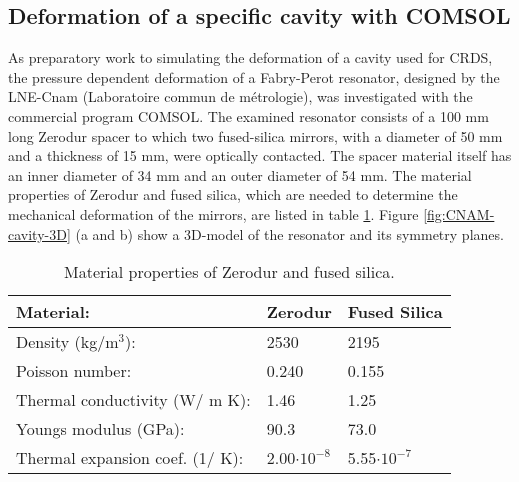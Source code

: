 \subsection{Deformation of a specific cavity with COMSOL}
As preparatory work to simulating the deformation of a cavity used for CRDS, the pressure dependent deformation of a Fabry-Perot resonator, designed by the LNE-Cnam (Laboratoire commun de métrologie), was investigated with the commercial program COMSOL. The examined resonator consists of a 100 mm long Zerodur spacer to which two fused-silica mirrors, with a diameter of 50 mm and a thickness of 15 mm, were optically contacted. The spacer material itself has an inner diameter of 34 mm and an outer diameter of 54 mm. The material properties of Zerodur and fused silica, which are needed to determine the mechanical deformation of the mirrors, are listed in table \ref{table:COMSOL-parameter-cavity-franzosen}. Figure \ref{fig:CNAM-cavity-3D} (a and b) show a 3D-model of the resonator and its symmetry planes. 
\noindent
\begin{table}[H]
	\begin{center}
		\begin{tabular}{ lll }
			
			\textbf{Material}: & \textbf{Zerodur} & \textbf{Fused Silica}\\
			\toprule
			Density (kg/m$^3$): & 2530  & 2195\\
			\midrule
			Poisson number:  & 0.240 &  0.155\\
			\midrule
			Thermal conductivity (W/ m K): & 1.46  & 1.25\\
			\midrule
			Youngs modulus (GPa): & 90.3  & 73.0\\
			\midrule
			Thermal expansion coef. (1/ K): & 2.00$\cdot 10^{-8}$  &5.55$\cdot 10^{-7}$\\
			\bottomrule
		\end{tabular}
	\end{center}
	\caption{Material properties of Zerodur and fused silica.}
	\label{table:COMSOL-parameter-cavity-franzosen}
\end{table}

